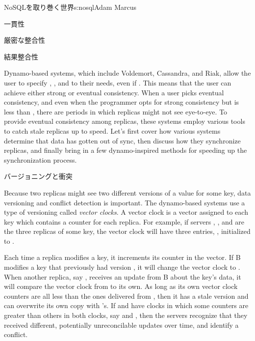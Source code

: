 \begin{aosachapter}{NoSQLを取り巻く世界}{s:nosql}{Adam Marcus}
\begin{aosasect1}{一貫性}
\begin{aosasect2}{厳密な整合性}
\end{aosasect2}

\begin{aosasect2}{結果整合性}

Dynamo-based systems, which include Voldemort, Cassandra, and Riak,
allow the user to specify , , and  to their
needs, even if .  This means that the user
can achieve either strong or eventual consistency.  When a user picks
eventual consistency, and even when the programmer opts for strong
consistency but  is less than , there are periods in
which replicas might not see eye-to-eye.  To provide eventual
consistency among replicas, these systems employ various tools to
catch stale replicas up to speed.  Let's first cover how various
systems determine that data has gotten out of sync, then discuss how
they synchronize replicas, and finally bring in a few dynamo-inspired
methods for speeding up the synchronization process.

\begin{aosasect3}{バージョニングと衝突}

Because two replicas might see two different versions of a value for
some key, data versioning and conflict detection is important.  The
dynamo-based systems use a type of versioning called \emph{vector
clocks}.  A vector clock is a vector assigned to each key which
contains a counter for each replica.  For example, if
servers , , and  are the three replicas of
some key, the vector clock will have three entries, , initialized to .

Each time a replica modifies a key, it increments its counter in the
vector.  If B modifies a key that previously had version , it will change the vector clock to .  When
another replica, say , receives an update from B about the
key's data, it will compare the vector clock from  to its own.
As long as its own vector clock counters are all less than the ones
delivered from , then it has a stale version and can overwrite
its own copy with 's.  If  and  have clocks in
which some counters are greater than others in both clocks, say
 and , then the servers recognize
that they received different, potentially unreconcilable updates over
time, and identify a conflict.


\end{aosasect3}
\end{aosasect2}
\end{aosasect1}
\end{aosachapter}
